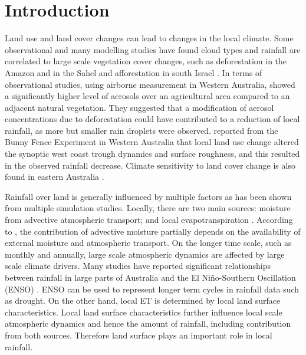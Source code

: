 \documentclass[authoryear,preprint,review,12pt]{elsarticle}
\begin{document}
\section{Introduction}

Land use and land cover changes can lead to changes in the local climate. Some observational and many modelling studies have found cloud types and rainfall are correlated to large scale vegetation cover changes, such as deforestation in the Amazon and in the Sahel \citep{Chagnon2005,Pinto2009, Wang2009, Mei2010, kucharski_further_2013,pitman_scale_2016} and afforestation in south Israel \citep{Otterman1990, Ben-Gai1998}. In terms of observational studies, using airborne measurement in Western Australia, \citet{Junkermann2009} showed a significantly higher level of aerosols over an agricultural area compared to an adjacent natural vegetation. They suggested that a modification of aerosol concentrations due to deforestation could have contributed to a reduction of local rainfall, as more but smaller rain droplets were observed. \citet{Nair2011} reported from the Bunny Fence Experiment in Western Australia that local land use change altered the synoptic west coast trough dynamics and surface roughness, and this resulted in the observed rainfall decrease. Climate sensitivity to land cover change is also found in eastern Australia \citep{McAlpine2007}. 

Rainfall over land is generally influenced by multiple factors as has been shown from multiple simulation studies. Locally, there are two main sources: moisture from advective atmospheric transport; and local evapotranspiration \citep{Eltahir1996,Bosilovich2006,Dirmeyer2009,Gimeno2010}. According to \citet{Trenberth1999}, the contribution of advective moisture partially depends on the availability of external moisture and atmospheric transport. On the longer time scale, such as monthly and annually, large scale atmospheric dynamics are affected by large scale climate drivers. Many studies have reported significant relationships between rainfall in large parts of Australia and the El Ni\~{n}o-Southern Oscillation (ENSO) \citep{Verdon2004,Risbey2009,Speer2011}. ENSO can be used to represent longer term cycles in rainfall data such as drought. On the other hand, local ET is determined by local land surface characteristics. Local land surface characteristics further influence local scale atmospheric dynamics and hence the amount of rainfall, including contribution from both sources. Therefore land surface plays an important role in local rainfall. 
\end{document}
